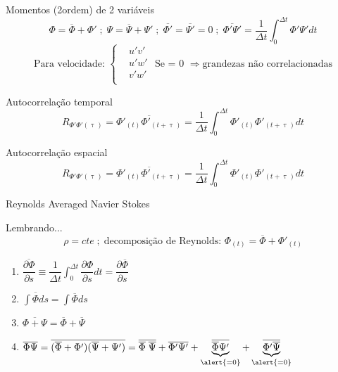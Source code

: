 \documentclass[10pt]{beamer}
\newcommand{\m}[1]{\overline{#1}}
\begin{document}
\begin{frame}{Momentos (2\textordfeminine ordem) de 2 variáveis}
	\begin{equation*}
	\Phi = \m{\Phi} + \Phi' \;;\;
	\Psi = \m{\Psi} + \Psi' \;;\;
	\m{\Phi'} = \m{\Psi'} = 0 \;;\;
	\boxed{\m{\Phi' \Psi'} = \dfrac{1}{\Delta t} \int_{0}^{\Delta t} \Phi' \Psi' dt}
	\end{equation*}
	\begin{equation*}
		\text{Para velocidade: }\begin{cases}
		 & u'v' \\ 
		 & u'w'  \\ 
		 & v'w' \\ 
		\end{cases} \text{ Se = 0 }\Rightarrow \text{grandezas não correlacionadas}
	\end{equation*}
	\begin{block}{Autocorrelação temporal}
		\begin{equation*}
		R_{\Phi'\Phi'(\uptau)} = \m{\Phi'_{(t)}\Phi'_{(t+\uptau)}} = \dfrac{1}{\Delta t} \int_{0}^{\Delta t} \Phi'_{(t)}\Phi'_{(t+\uptau)} dt
		\end{equation*}
	\end{block}
	\begin{block}{Autocorrelação espacial}
		\begin{equation*}
		R_{\Phi'\Phi'(\uptau)} = \m{\Phi'_{(t)}\Phi'_{(t+\uptau)}} = \dfrac{1}{\Delta t} \int_{0}^{\Delta t} \Phi'_{(t)}\Phi'_{(t+\uptau)} dt
		\end{equation*}
	\end{block}

\end{frame}

\begin{frame}{Reynolds Averaged Navier Stokes}
	\begin{block}{Lembrando...}
	\begin{equation*}
	\rho = cte \;;\;\text{decomposição de Reynolds: }\Phi_{(t)} = \m{\Phi} + \Phi'_{(t)}
	\end{equation*}
	\end{block}

	\begin{enumerate}[$\bullet$]
		\item $ \m{\dfrac{\partial \Phi}{\partial s}} 
		\equiv \dfrac{1}{\Delta t} \int_{0}^{\Delta t} \dfrac{\partial \Phi}{\partial s} dt 
		= \dfrac{\partial \m{\Phi}}{\partial s} $
		\vspace*{0.4cm}
		\item $ \m{\int\Phi ds} = \int \m{\Phi} ds $ \vspace*{0.4cm}
		\item $ \m{\Phi + \Psi} = \m{\Phi} + \m{\Psi} $ \vspace*{0.4cm}
		\item $ \m{\Phi \Psi} = \m{(\m{\Phi} + \Phi') (\m{\Psi} + \Psi')}
		= \m{\m{\Phi}\;\m{\Psi}} + \m{\Phi'\Psi'}
		+ \underbrace{\m{\m{\Phi}\Psi'}}_{\alert{= 0}}
		+ \underbrace{\m{\Phi'\m{\Psi}}}_{\alert{= 0}} $
	\end{enumerate}

\end{frame}
\end{document}
